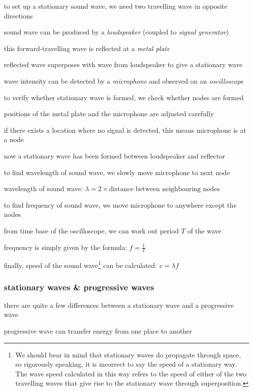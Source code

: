 \cmt to set up a stationary sound wave, we need two travelling wave in opposite directions

sound wave can be produced by a \emph{loudspeaker} (coupled to \emph{signal generator})

this forward-travelling wave is reflected at a \emph{metal plate}

reflected wave superposes with wave from loudspeaker to give a stationary wave

wave intensity can be detected by a \emph{microphone} and observed on an \emph{oscilloscope}

\cmt to verify whether stationary wave is formed, we check whether nodes are formed

positions of the metal plate and the microphone are adjusted carefully

if there exists a location where no signal is detected, this means microphone is at a node

now a stationary wave has been formed between loudspeaker and reflector

\cmt to find wavelength of sound wave, we slowly move microphone to next node

wavelength of sound wave: $\lambda = 2\times \text{distance between neighbouring nodes}$

\cmt to find frequency of sound wave, we move microphone to anywhere except the nodes

from time base of the oscilloscope, we can work out period $T$ of the wave

frequency is simply given by the formula: $f=\frac{1}{T}$

\cmt finally,  speed of the sound wave\footnote{We should bear in mind that stationary waves do propagate through space, so rigorously speaking, it is incorrect to say the speed of a stationary way. The wave speed calculated in this way refers to the speed of either of the two travelling waves that give rise to the stationary wave through superposition.} can be calculated: $v=\lambda f$




\subsubsection{stationary waves \& progressive waves}

there are quite a few differences between a stationary wave and a progressive wave

\cmt progressive wave can transfer energy from one place to another

